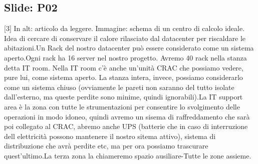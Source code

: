 \subsection{Slide: P02}
[3] In alt: articolo da leggere. Immagine: schema di un centro di calcolo ideale. Idea di cercare di conservare il calore rilasciato dal datacenter per riscaldare le abitazioni.\newline
[4] Un Rack del nostro datacenter può essere considerato come un sistema aperto.\newline
[5] Ogni rack ha 16 server nel nostro progetto. \newline
[6] Avremo 40 rack nella stanza detta IT room. Nella IT room c'è anche un'unità CRAC che possiamo vedere, pure lui, come sistema aperto. La stanza intera, invece, possiamo considerarlo come un sistema chiuso (ovviamente le pareti non saranno del tutto isolate dall'esterno, ma queste perdite sono minime, quindi ignorabili).\newline
[7] La IT support area è la zona con tutte le strumentazioni per consentire lo svolgimento delle operazioni in modo idoneo, quindi avremo un sisema di raffreddamento che sarà poi collegato al CRAC, abremo anche UPS (batterie che in caso di interruzione dell elettricità possono mantenere il nostro sitema attivo), sistema di distribuzione che avrà perdite etc, ma per ora possiamo trascurare quest'ultimo.\newline
[8] La terza zona la chiameremo spazio ausiliare-\newline
[9] Tutte le zone assieme.\newline
[10]
\newpage